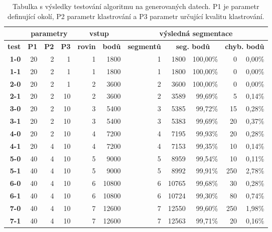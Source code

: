 \documentclass[11pt,twoside,a4paper]{book}
\begin{document}
\begin{table}[ht]
\resizebox{\textwidth}{!} {
\begin{tabular}{|r|r|r|r|r|r|r|r|r|r|r|}
\hline
\multicolumn{1}{|l|}{} & \multicolumn{ 3}{c|}{\textbf{parametry}} & \multicolumn{ 2}{c|}{\textbf{vstup}} & \multicolumn{ 5}{c|}{\textbf{výsledná segmentace}} \\ \hline
\textbf{test} & \multicolumn{1}{c|}{\textbf{P1}} & \multicolumn{1}{c|}{\textbf{P2}} & \multicolumn{1}{c|}{\textbf{P3}} & \multicolumn{1}{c|}{\textbf{rovin}} & \multicolumn{1}{c|}{\textbf{bodů}} & \multicolumn{1}{c|}{\textbf{segmentů}} & \multicolumn{ 2}{c|}{\textbf{seg. bodů}} & \multicolumn{ 2}{c|}{\textbf{chyb. bodů}} \\ \hline
\textbf{1-0} & 20 & 2 & 1 & 1 & 1800 & 1 & 1800 & 100,00\% & 0 & 0,00\% \\ \hline
\textbf{1-1} & 20 & 2 & 1 & 1 & 1800 & 1 & 1800 & 100,00\% & 0 & 0,00\% \\ \hline
\textbf{2-0} & 20 & 2 & 1 & 2 & 3600 & 2 & 3600 & 100,00\% & 0 & 0,00\% \\ \hline
\textbf{2-1} & 20 & 2 & 10 & 2 & 3600 & 2 & 3589 & 99,69\% & 5 & 0,14\% \\ \hline
\textbf{3-0} & 20 & 2 & 10 & 3 & 5400 & 3 & 5385 & 99,72\% & 15 & 0,28\% \\ \hline
\textbf{3-1} & 20 & 2 & 10 & 3 & 5400 & 3 & 5383 & 99,69\% & 20 & 0,37\% \\ \hline
\textbf{4-0} & 20 & 2 & 10 & 4 & 7200 & 4 & 7195 & 99,93\% & 20 & 0,28\% \\ \hline
\textbf{4-1} & 20 & 4 & 10 & 4 & 7200 & 4 & 7153 & 99,35\% & 10 & 0,14\% \\ \hline
\textbf{5-0} & 40 & 4 & 10 & 5 & 9000 & 5 & 8959 & 99,54\% & 10 & 0,11\% \\ \hline
\textbf{5-1} & 40 & 4 & 10 & 5 & 9000 & 5 & 8992 & 99,91\% & 250 & 2,78\% \\ \hline
\textbf{6-0} & 40 & 4 & 10 & 6 & 10800 & 6 & 10765 & 99,68\% & 30 & 0,28\% \\ \hline
\textbf{6-1} & 40 & 4 & 10 & 6 & 10800 & 6 & 10724 & 99,30\% & 80 & 0,74\% \\ \hline
\textbf{7-0} & 40 & 4 & 10 & 7 & 12600 & 7 & 12550 & 99,60\% & 250 & 1,98\% \\ \hline
\textbf{7-1} & 40 & 4 & 10 & 7 & 12600 & 7 & 12563 & 99,71\% & 20 & 0,16\% \\ \hline
\end{tabular}
}
\caption{Tabulka s výsledky testování algoritmu na generovaných datech. P1 je parametr definující okolí, P2 parametr klastrování a P3 parametr určující kvalitu klastrování.} 
\label{table:test1-gen}
\end{table}
\end{document}
